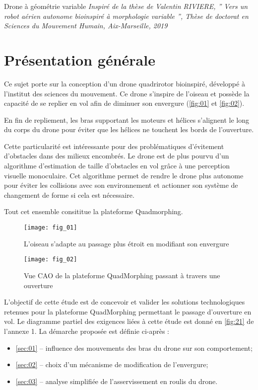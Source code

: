 
Drone à géométrie variable
\textit{Inspiré de la thèse de Valentin RIVIERE,
” Vers un robot aérien autonome bio­inspiré à morphologie variable ”,
Thèse de doctorat en Sciences du Mouvement Humain, Aix-­Marseille, 2019}

\section*{Présentation générale}


Ce sujet porte sur la conception d’un drone quadrirotor bio­inspiré, développé à l’institut des
sciences du mouvement. Ce drone s’inspire de l’oiseau et possède la capacité de se replier
en vol afin de diminuer son envergure (\autoref{fig:01} et \autoref{fig:02}).

En fin de repliement, les bras supportant les moteurs et hélices s’alignent le long du corps
du drone pour éviter que les hélices ne touchent les bords de l’ouverture.

Cette particularité est intéressante pour des problématiques d’évitement d’obstacles dans
des milieux encombrés. Le drone est de plus pourvu d’un algorithme d’estimation de taille
d’obstacles en vol grâce à une perception visuelle monoculaire. Cet algorithme permet de
rendre le drone plus autonome pour éviter les collisions avec son environnement et actionner
son système de changement de forme si cela est nécessaire.

Tout cet ensemble consititue la plateforme Quadmorphing.


\begin{minipage}[c]{.48\linewidth}
\begin{figure}[H]
\centering
\texttt{[image: fig\_01]}
\caption{\label{fig:01} L’oiseau s’adapte au passage
plus étroit en modifiant son envergure}
\end{figure}
\end{minipage}\hfill
\begin{minipage}[c]{.48\linewidth}
\begin{figure}[H]
\centering
\texttt{[image: fig\_02]}
\caption{\label{fig:02} Vue CAO de la plateforme QuadMorphing passant à travers une ouverture}
\end{figure}
\end{minipage}

L'objectif de cette étude est de concevoir et valider les solutions technologiques retenues
pour la plateforme QuadMorphing permettant le passage d’ouverture en vol. Le diagramme
partiel des exigences liées à cette étude est donné en \autoref{fig:21} de l’annexe 1.
La démarche proposée est définie ci­-après :
\begin{itemize}
\item ­\autoref{sec:01} --­ influence des mouvements des bras du drone sur son comportement;
\item ­\autoref{sec:02} --­ choix d’un mécanisme de modification de l’envergure;
\item ­\autoref{sec:03} --­ analyse simplifiée de l’asservissement en roulis du drone.
\end{itemize}


